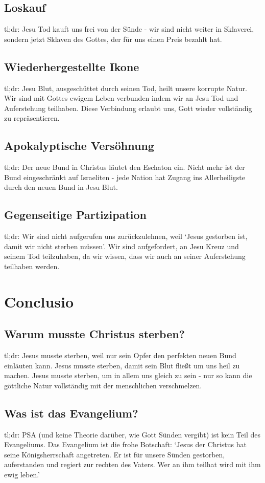 \documentclass[12pt]{report}
\begin{document}
\section{Loskauf}
tl;dr:
Jesu Tod kauft uns frei von der Sünde - wir sind nicht weiter in Sklaverei, sondern jetzt Sklaven des Gottes, der für uns einen Preis bezahlt hat.

\section{Wiederhergestellte Ikone}
tl;dr:
Jesu Blut, ausgeschüttet durch seinen Tod, heilt unsere korrupte Natur.
Wir sind mit Gottes ewigem Leben verbunden indem wir an Jesu Tod und Auferstehung teilhaben.
Diese Verbindung erlaubt uns, Gott wieder vollständig zu repräsentieren.

\section{Apokalyptische Versöhnung}
tl;dr:
Der neue Bund in Christus läutet den Eschaton ein.
Nicht mehr ist der Bund eingeschränkt auf Israeliten - jede Nation hat Zugang ins Allerheiligste durch den neuen Bund in Jesu Blut.

\section{Gegenseitige Partizipation}
tl;dr:
Wir sind nicht aufgerufen uns zurückzulehnen, weil `Jesus gestorben ist, damit wir nicht sterben müssen'.
Wir sind aufgefordert, an Jesu Kreuz und seinem Tod teilzuhaben, da wir wissen, dass wir auch an seiner Auferstehung teilhaben werden.

\chapter{Conclusio}
\section{Warum musste Christus sterben?}
tl;dr:
Jesus musste sterben, weil nur sein Opfer den perfekten neuen Bund einläuten kann.
Jesus musste sterben, damit sein Blut fließt um uns heil zu machen.
Jesus musste sterben, um in allem uns gleich zu sein - nur so kann die göttliche Natur vollständig mit der menschlichen verschmelzen.

\section{Was ist das Evangelium?}
tl;dr:
PSA (und keine Theorie darüber, wie Gott Sünden vergibt) ist kein Teil des Evangeliums.
Das Evangelium ist die frohe Botschaft:
`Jesus der Christus hat seine Königsherrschaft angetreten. Er ist für unsere Sünden gestorben, auferstanden und regiert zur rechten des Vaters.
Wer an ihm teilhat wird mit ihm ewig leben.'
\end{document}

